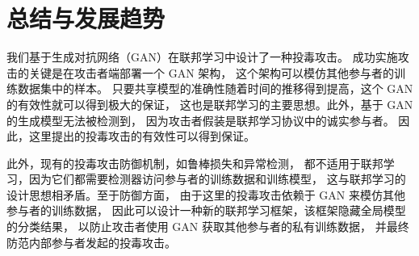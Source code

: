 \documentclass[../main.tex]{subfiles}
\begin{document}
\section{总结与发展趋势}
我们基于生成对抗网络（GAN）在联邦学习中设计了一种投毒攻击。
成功实施攻击的关键是在攻击者端部署一个 GAN 架构，
这个架构可以模仿其他参与者的训练数据集中的样本。
只要共享模型的准确性随着时间的推移得到提高，这个 GAN 的有效性就可以得到极大的保证，
这也是联邦学习的主要思想。此外，基于 GAN 的生成模型无法被检测到，
因为攻击者假装是联邦学习协议中的诚实参与者。
因此，这里提出的投毒攻击的有效性可以得到保证。

此外，现有的投毒攻击防御机制，如鲁棒损失和异常检测，
都不适用于联邦学习，因为它们都需要检测器访问参与者的训练数据和训练模型，
这与联邦学习的设计思想相矛盾。至于防御方面，
由于这里的投毒攻击依赖于 GAN 来模仿其他参与者的训练数据，
因此可以设计一种新的联邦学习框架，该框架隐藏全局模型的分类结果，
以防止攻击者使用 GAN 获取其他参与者的私有训练数据，
并最终防范内部参与者发起的投毒攻击。
%
\end{document}
